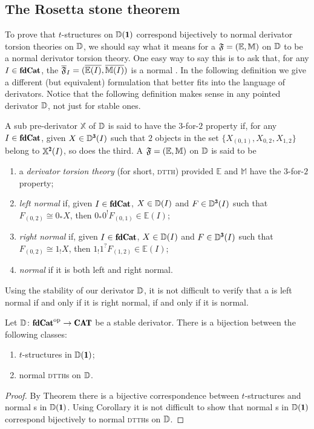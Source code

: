 \color{black}

\subsection{The Rosetta stone theorem}\label{higher_rosetta_subs}
To prove that $t$-structures on $\D(\uno)$ correspond bijectively to normal derivator torsion theories on $\mathbb{D}$,  we should say what it means for a \dfs $\mathfrak{F}=(\mathbb E,\mathbb M)$ on $\mathbb{D}$ to be a normal derivator torsion theory. One easy way to say this is to ask that, for any $I\in \fincat$, the {\hfs} $\overline{\mathfrak{F}}_I=(\overline{\mathbb E(I)},\overline{\mathbb M(I)})$ is a normal \htth. In the following definition we give a different (but equivalent) formulation that better fits into the language of derivators. Notice that the following definition makes sense in any pointed derivator $\mathbb{D}$, not just for stable ones.

\begin{definition}
A sub pre-derivator $\mathbb X$ of $\mathbb{D}$ is said to have the $3$-for-$2$ property if, for any $I\in \fincat$, given $X\in \D^\tre(I)$ such that $2$ objects in the set $\{X_{(0,1)},X_{0,2},X_{1,2}\}$ belong to $\mathbb X^{\due}(I)$, so does the third. A \dfs $\mathfrak{F}=(\mathbb E,\mathbb M)$ on $\mathbb{D}$ is said to be
\begin{enumerate}
\item a \emph{derivator torsion theory} (for short, \textsc{dtth}) provided $\mathbb E$ and $\mathbb M$ have the $3$-for-$2$ property;
\item \emph{left normal} if, given $I\in \fincat$, $X\in \mathbb{D}(I)$ and $F\in \D^\tre({I})$ such that $F_{(0,2)}\cong 0_*X$, then $0_*0^!F_{(0,1)}\in \mathbb E(I)$;
\item \emph{right normal} if, given $I\in \fincat$, $X\in \mathbb{D}(I)$ and $F\in \D^\tre({I})$ such that $F_{(0,2)}\cong 1_!X$, then $1_!1^?F_{(1,2)}\in \mathbb E(I)$;
\item \emph{normal} if it is both left and right normal.
\end{enumerate}
\end{definition}

Using the stability of our derivator $\mathbb{D}$, it is not difficult to verify that a \dfs is left normal if and only if it is right normal, if and only if it is normal.

\begin{theorem}\label{derrosetta}
Let $\D\colon \fincat^\opp\to \Cat$ be a stable derivator. There is a bijection between the following classes:
\begin{enumerate}
\item $t$-structures in $\D(\uno)$; 
\item normal \textsc{dtth}s on $\mathbb{D}$.
\end{enumerate}
\end{theorem}
\begin{proof}
By Theorem  there is a bijective correspondence between $t$-structures and normal {\htth}s in $\D(\uno)$. Using Corollary  it is not difficult to show that normal {\htth}s in $\D(\uno)$ correspond bijectively to normal \textsc{dtth}s on $\mathbb{D}$.
\end{proof}

